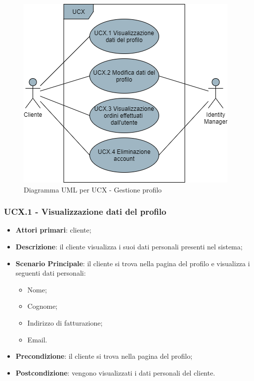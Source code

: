 \begin{figure}[H]
\centering
\includegraphics[scale=0.6]{res/UseCase/Immagini/GestioneProfilo}
\caption{Diagramma UML per UCX - Gestione profilo}
\end{figure}

\subsubsection{UCX.1 - Visualizzazione dati del profilo}
\begin{itemize}
\item \textbf{Attori primari}: cliente;
\item \textbf{Descrizione}: il cliente visualizza i suoi dati personali presenti nel sistema;
\item \textbf{Scenario Principale}: il cliente si trova nella pagina del profilo e visualizza i seguenti dati personali:
\begin{itemize}
\item Nome;
\item Cognome;
\item Indirizzo di fatturazione;
\item Email.
\end{itemize}
\item \textbf{Precondizione}: il cliente si trova nella pagina del profilo;
\item \textbf{Postcondizione}: vengono visualizzati i dati personali del cliente.
\end{itemize}

